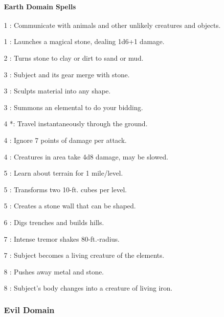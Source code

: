 \paragraph{Earth Domain Spells}
\begin{list}{}{\leftmargin=1em}
\item[1] : Communicate with animals and other unlikely creatures and objects.
\item[1] : Launches a magical stone, dealing 1d6+1 damage.
\item[2] : Turns stone to clay or dirt to sand or mud.
\item[3] : Subject and its gear merge with stone.
\item[3] : Sculpts material into any shape.
\item[3] : Summons an elemental to do your bidding.
\item[4] *: Travel instantaneously through the ground.
\item[4] : Ignore 7 points of damage per attack.
\item[4] : Creatures in area take 4d8 damage, may be slowed.
\item[5] : Learn about terrain for 1 mile/level.
\item[5] : Transforms two 10-ft. cubes per level.
\item[5] : Creates a stone wall that can be shaped.
\item[6] : Digs trenches and builds hills.
\item[7] : Intense tremor shakes 80-ft.-radius.
\item[7] : Subject becomes a living creature of the elements.
\item[8] : Pushes away metal and stone.
\item[8] : Subject's body changes into a creature of living iron.
\end{list}
\subsubsection{Evil Domain}
